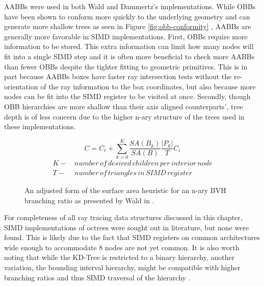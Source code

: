 AABBs were used in both Wald and Dammertz's implementations. While OBBs have
been shown to conform more quickly to the underlying geometry and can generate
more shallow trees as seen in Figure \ref{fig:obb-conformity} , AABBs are
generally more favorable in SIMD implementations. First, OBBs require more
information to be stored. This extra information can limit how many nodes will
fit into a single SIMD step and it is often more beneficial to check more AABBs
than fewer OBBs despite the tighter fitting to geometric primitives. This is in
part because AABBs boxes have faster ray intersection tests without the
re-orientation of the ray information to the box coordinates, but also because
more nodes can be fit into the SIMD register to be visited at once. Secondly,
though OBB hierarchies are more shallow than their axis aligned counterparts',
tree depth is of less concern due to the higher n-ary structure of the trees
used in these implementations.

\setcounter{footnote}{1}

\begin{figure}[H]
  \begin{equation}
    C = C_t + \sum_{k=0}^{K} \frac{SA(B_k)}{SA(B)}\frac{|P_k|}{T}C_i
  \end{equation}
  \begin{align*}
    K - & \, number \, of \, desired \, children \, per \, interior \, node \\
    T - & \, number \, of \, triangles \, in \, SIMD \, register
  \end{align*}
  \caption[Form of the surface area heuristic for an n-ary tree.]{An adjusted
    form of the surface area heuristic for an n-ary BVH branching ratio as
    presented by Wald in \cite{Wald_2008}. \protect\footnotemark}
  \label{adjusted_SAH}
\end{figure}


For completeness of all ray tracing data structures discussed in this chapter,
SIMD implementations of octrees were sought out in literature, but none were
found. This is likely due to the fact that SIMD registers on common
architectures wide enough to accommodate 8 nodes are not yet common. It is also
worth noting that while the KD-Tree is restricted to a binary hierarchy, another
variation, the bounding interval hierarchy, might be compatible with higher
branching ratios and thus SIMD traversal of the hierarchy \cite{Watcher_2006}.

